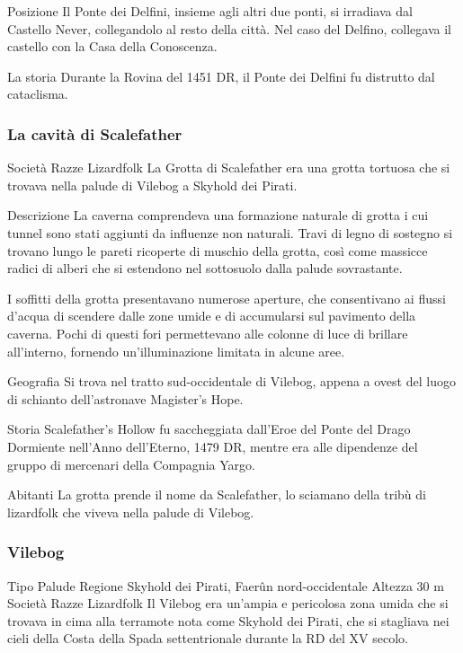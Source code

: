 \documentclass{article}
\begin{document}
Posizione
Il Ponte dei Delfini, insieme agli altri due ponti, si irradiava dal Castello Never, collegandolo al resto della città. Nel caso del Delfino, collegava il castello con la Casa della Conoscenza.

La storia
Durante la Rovina del 1451 DR, il Ponte dei Delfini fu distrutto dal cataclisma.
\subsubsection{La cavità di Scalefather}
Società
Razze
Lizardfolk
La Grotta di Scalefather era una grotta tortuosa che si trovava nella palude di Vilebog a Skyhold dei Pirati.

Descrizione\newline
La caverna comprendeva una formazione naturale di grotta i cui tunnel sono stati aggiunti da influenze non naturali. Travi di legno di sostegno si trovano lungo le pareti ricoperte di muschio della grotta, così come massicce radici di alberi che si estendono nel sottosuolo dalla palude sovrastante.

I soffitti della grotta presentavano numerose aperture, che consentivano ai flussi d'acqua di scendere dalle zone umide e di accumularsi sul pavimento della caverna. Pochi di questi fori permettevano alle colonne di luce di brillare all'interno, fornendo un'illuminazione limitata in alcune aree.

Geografia\newline
Si trova nel tratto sud-occidentale di Vilebog, appena a ovest del luogo di schianto dell'astronave Magister's Hope.

Storia\newline
Scalefather's Hollow fu saccheggiata dall'Eroe del Ponte del Drago Dormiente nell'Anno dell'Eterno, 1479 DR, mentre era alle dipendenze del gruppo di mercenari della Compagnia Yargo.

Abitanti\newline
La grotta prende il nome da Scalefather, lo sciamano della tribù di lizardfolk che viveva nella palude di Vilebog.
\subsubsection{Vilebog}
Tipo
Palude
Regione
Skyhold dei Pirati, Faerûn nord-occidentale
Altezza
30 m
Società
Razze
Lizardfolk
Il Vilebog era un'ampia e pericolosa zona umida che si trovava in cima alla terramote nota come Skyhold dei Pirati, che si stagliava nei cieli della Costa della Spada settentrionale durante la RD del XV secolo.
\end{document}
